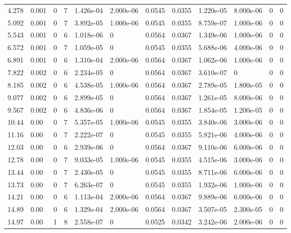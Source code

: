 \documentclass[preview]{standalone}
\begin{document}
{{\begin{tabular}{L{1.2cm}C{1.2cm} C{0.3cm}C{0.5cm} C{1.4cm}C{1.4cm} C{1.4cm}C{1.4cm} C{1.6cm}C{1.6cm} C{1.6cm}C{1.6cm}}
  4.278  &  0.001  & 0     &  7 &  1.426e-04  & 2.000e-06  &  0.0545&   0.0355& 1.220e-05 & 8.000e-06   &  0 & 0  \\ 
  5.092  &  0.001  & 0     &  7 &  3.892e-05  & 1.000e-06  &  0.0545&   0.0355& 8.759e-07 & 1.000e-06   &  0 & 0  \\ 
  5.543  &  0.001  & 0     &  6 &  1.018e-06  & 0  &  0.0564&   0.0367& 1.349e-06 & 1.000e-06   &  0 & 0  \\ 
  6.572  &  0.001  & 0     &  7 &  1.059e-05  & 0  &  0.0545&   0.0355& 5.688e-06 & 4.000e-06   &  0 & 0  \\ 
  6.891  &  0.001  & 0     &  6 &  1.310e-04  & 2.000e-06  &  0.0564&   0.0367& 1.062e-06 & 1.000e-06   &  0 & 0  \\ 
  7.822  &  0.002  & 0     &  6 &  2.234e-05  & 0  &  0.0564&   0.0367& 3.610e-07 & 0   &  0 & 0  \\ 
  8.185  &  0.002  & 0     &  6 &  4.538e-05  & 1.000e-06  &  0.0564&   0.0367& 2.789e-05 & 1.800e-05   &  0 & 0  \\ 
  9.077  &  0.002  & 0     &  6 &  2.899e-05  & 0  &  0.0564&   0.0367& 1.261e-05 & 8.000e-06   &  0 & 0  \\ 
  9.567  &  0.002  & 0     &  6 &  4.836e-06  & 0  &  0.0564&   0.0367& 1.854e-05 & 1.200e-05   &  0 & 0  \\ 
  10.44  &  0.00  & 0     &  7 &  5.357e-05  & 1.000e-06  &  0.0545&   0.0355& 3.840e-06 & 3.000e-06   &  0 & 0  \\ 
  11.16  &  0.00  & 0     &  7 &  2.222e-07  & 0  &  0.0545&   0.0355& 5.821e-06 & 4.000e-06   &  0 & 0  \\ 
  12.03  &  0.00  & 0     &  6 &  2.939e-06  & 0  &  0.0564&   0.0367& 9.110e-06 & 6.000e-06   &  0 & 0  \\ 
  12.78  &  0.00  & 0     &  7 &  9.033e-05  & 1.000e-06  &  0.0545&   0.0355& 4.515e-06 & 3.000e-06   &  0 & 0  \\ 
  13.44  &  0.00  & 0     &  7 &  2.430e-05  & 0  &  0.0545&   0.0355& 8.711e-06 & 6.000e-06   &  0 & 0  \\ 
  13.73  &  0.00  & 0     &  7 &  6.263e-07  & 0  &  0.0545&   0.0355& 1.932e-06 & 1.000e-06   &  0 & 0  \\ 
  14.21  &  0.00  & 0     &  6 &  1.113e-04  & 2.000e-06  &  0.0564&   0.0367& 9.889e-06 & 6.000e-06   &  0 & 0  \\ 
  14.89  &  0.00  & 0     &  6 &  1.329e-04  & 2.000e-06  &  0.0564&   0.0367& 3.507e-05 & 2.300e-05   &  0 & 0  \\ 
  14.97  &  0.00  & 1     &  8 &  2.558e-07  & 0  &  0.0525&   0.0342& 3.242e-06 & 2.000e-06   &  0 & 0  \\ 

\end{tabular}}}
\end{document}
